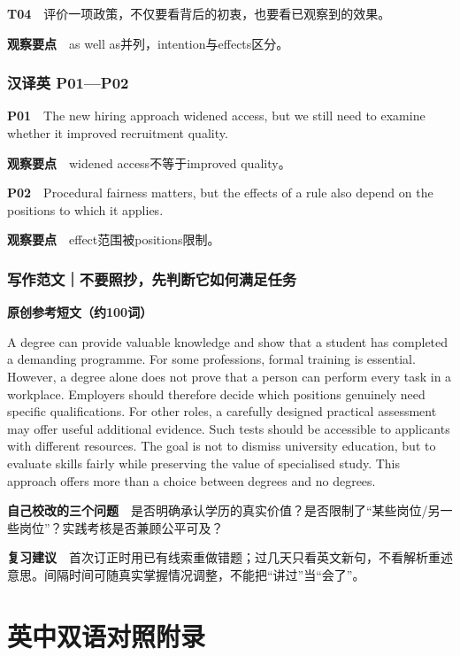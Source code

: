 \documentclass[
  11pt,
]{ctexart}
\begin{document}
\textbf{T04}　评价一项政策，不仅要看背后的初衷，也要看已观察到的效果。

\textbf{观察要点}　as well as并列，intention与effects区分。

\subsubsection{汉译英 P01---P02}\label{ux6c49ux8bd1ux82f1-p01p02}

\textbf{P01}　The new hiring approach widened access, but we still need
to examine whether it improved recruitment quality.

\textbf{观察要点}　widened access不等于improved quality。

\textbf{P02}　Procedural fairness matters, but the effects of a rule
also depend on the positions to which it applies.

\textbf{观察要点}　effect范围被positions限制。

\subsubsection{写作范文｜不要照抄，先判断它如何满足任务}\label{ux5199ux4f5cux8303ux6587ux4e0dux8981ux7167ux6284ux5148ux5224ux65adux5b83ux5982ux4f55ux6ee1ux8db3ux4efbux52a1}

\textbf{原创参考短文（约100词）}

A degree can provide valuable knowledge and show that a student has
completed a demanding programme. For some professions, formal training
is essential. However, a degree alone does not prove that a person can
perform every task in a workplace. Employers should therefore decide
which positions genuinely need specific qualifications. For other roles,
a carefully designed practical assessment may offer useful additional
evidence. Such tests should be accessible to applicants with different
resources. The goal is not to dismiss university education, but to
evaluate skills fairly while preserving the value of specialised study.
This approach offers more than a choice between degrees and no degrees.

\textbf{自己校改的三个问题}　是否明确承认学历的真实价值？是否限制了``某些岗位/另一些岗位''？实践考核是否兼顾公平可及？

\textbf{复习建议}　首次订正时用已有线索重做错题；过几天只看英文新句，不看解析重述意思。间隔时间可随真实掌握情况调整，不能把``讲过''当``会了''。

\clearpage

\section{英中双语对照附录}\label{ux82f1ux4e2dux53ccux8bedux5bf9ux7167ux9644ux5f55}
\end{document}
